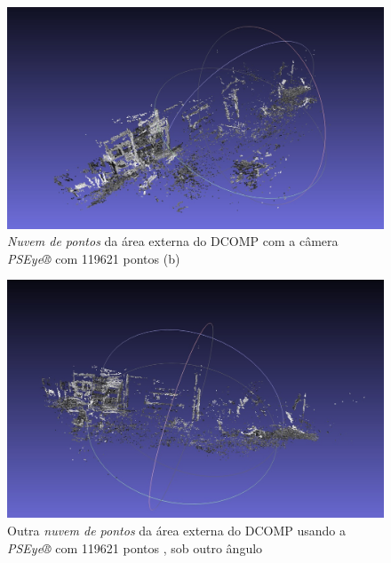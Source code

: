 \begin{figure}[H]
	\centering
		\includegraphics[width= \textwidth]{Imagens/figura4-6.jpg}
	\caption{\textit{Nuvem de pontos} da área externa do DCOMP com a câmera \textit{PSEye®} com 119621 pontos (b)}
	\label{fig4:6}
\end{figure}


\begin{figure}[H]
	\centering
		\includegraphics[width= \textwidth]{Imagens/figura4-8.jpg}
	\caption{Outra \textit{nuvem de pontos} da área externa do DCOMP usando a \textit{PSEye®} com 119621 pontos , sob outro ângulo}
	\label{fig4:8}
\end{figure}

